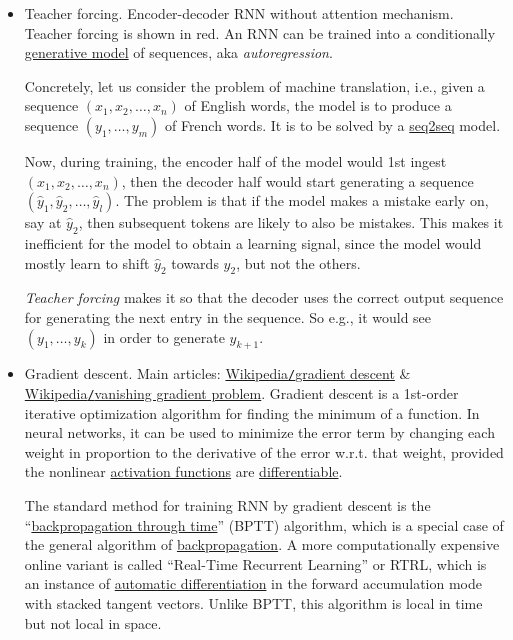 \documentclass{article}
\begin{document}
\begin{itemize}
	\item {\sf Teacher forcing.} {\sf Encoder-decoder RNN without attention mechanism. Teacher forcing is shown in red.} An RNN can be trained into a conditionally \href{https://en.wikipedia.org/wiki/Generative_model}{generative model} of sequences, aka {\it autoregression}.
	
	Concretely, let us consider the problem of machine translation, i.e., given a sequence $(x_1,x_2,\ldots,x_n)$ of English words, the model is to produce a sequence $(y_1,\ldots,y_m)$ of French words. It is to be solved by a \href{https://en.wikipedia.org/wiki/Seq2seq}{seq2seq} model.
	
	Now, during training, the encoder half of the model would 1st ingest $(x_1,x_2,\ldots,x_n)$, then the decoder half would start generating a sequence $(\hat{y}_1,\hat{y}_2,\ldots,\hat{y}_l)$. The problem is that if the model makes a mistake early on, say at $\hat{y}_2$, then subsequent tokens are likely to also be mistakes. This makes it inefficient for the model to obtain a learning signal, since the model would mostly learn to shift $\hat{y}_2$ towards $y_2$, but not the others.
	
	{\it Teacher forcing} makes it so that the decoder uses the correct output sequence for generating the next entry in the sequence. So e.g., it would see $(y_1,\ldots,y_k)$ in order to generate $\hat{y}_{k+1}$.
	\item {\sf Gradient descent.} Main articles: \href{https://en.wikipedia.org/wiki/Gradient_descent}{Wikipedia{\tt/}gradient descent} \& \href{https://en.wikipedia.org/wiki/Vanishing_gradient_problem}{Wikipedia{\tt/}vanishing gradient problem}. Gradient descent is a 1st-order iterative optimization algorithm for finding the minimum of a function. In neural networks, it can be used to minimize the error term by changing each weight in proportion to the derivative of the error w.r.t. that weight, provided the nonlinear \href{https://en.wikipedia.org/wiki/Activation_function}{activation functions} are \href{https://en.wikipedia.org/wiki/Differentiable_function}{differentiable}.
	
	The standard method for training RNN by gradient descent is the ``\href{https://en.wikipedia.org/wiki/Backpropagation_through_time}{backpropagation through time}'' (BPTT) algorithm, which is a special case of the general algorithm of \href{https://en.wikipedia.org/wiki/Backpropagation}{backpropagation}. A more computationally expensive online variant is called ``Real-Time Recurrent Learning'' or RTRL, which is an instance of \href{https://en.wikipedia.org/wiki/Automatic_differentiation}{automatic differentiation} in the forward accumulation mode with stacked tangent vectors. Unlike BPTT, this algorithm is local in time but not local in space.
	

\end{itemize}
\end{document}
